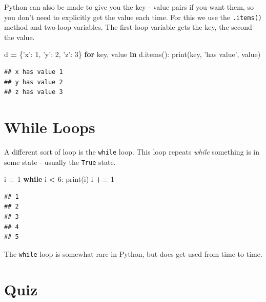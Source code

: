 \documentclass[]{book}
\newenvironment{Shaded}{\begin{snugshade}}{\end{snugshade}}
\newcommand{\BuiltInTok}[1]{#1}
\newcommand{\ControlFlowTok}[1]{\textcolor[rgb]{0.13,0.29,0.53}{\textbf{#1}}}
\newcommand{\DecValTok}[1]{\textcolor[rgb]{0.00,0.00,0.81}{#1}}
\newcommand{\KeywordTok}[1]{\textcolor[rgb]{0.13,0.29,0.53}{\textbf{#1}}}
\newcommand{\NormalTok}[1]{#1}
\newcommand{\OperatorTok}[1]{\textcolor[rgb]{0.81,0.36,0.00}{\textbf{#1}}}
\newcommand{\StringTok}[1]{\textcolor[rgb]{0.31,0.60,0.02}{#1}}
\theoremstyle{definition}
\theoremstyle{definition}
\theoremstyle{definition}
\theoremstyle{remark}
\begin{document}
Python can also be made to give you the key - value pairs if you want
them, so you don't need to explicitly get the value each time. For this
we use the \texttt{.items()} method and two loop variables. The first
loop variable gets the key, the second the value.

\begin{Shaded}
\begin{Highlighting}[]
\NormalTok{d }\OperatorTok{=}\NormalTok{ \{}\StringTok{'x'}\NormalTok{: }\DecValTok{1}\NormalTok{, }\StringTok{'y'}\NormalTok{: }\DecValTok{2}\NormalTok{, }\StringTok{'z'}\NormalTok{: }\DecValTok{3}\NormalTok{\} }
\ControlFlowTok{for}\NormalTok{ key, value }\KeywordTok{in}\NormalTok{ d.items():}
    \BuiltInTok{print}\NormalTok{(key, }\StringTok{'has value'}\NormalTok{, value)}
\end{Highlighting}
\end{Shaded}

\begin{verbatim}
## x has value 1
## y has value 2
## z has value 3
\end{verbatim}

\hypertarget{while-loops}{%
\section{While Loops}\label{while-loops}}

A different sort of loop is the \texttt{while} loop. This loop repeats
\emph{while} something is in some state - usually the \texttt{True}
state.

\begin{Shaded}
\begin{Highlighting}[]
\NormalTok{i }\OperatorTok{=} \DecValTok{1}
\ControlFlowTok{while}\NormalTok{ i }\OperatorTok{<} \DecValTok{6}\NormalTok{:}
  \BuiltInTok{print}\NormalTok{(i)}
\NormalTok{  i }\OperatorTok{+=} \DecValTok{1}
\end{Highlighting}
\end{Shaded}

\begin{verbatim}
## 1
## 2
## 3
## 4
## 5
\end{verbatim}

The \texttt{while} loop is somewhat rare in Python, but does get used
from time to time.

\hypertarget{quiz-3}{%
\section{Quiz}\label{quiz-3}}
\end{document}
